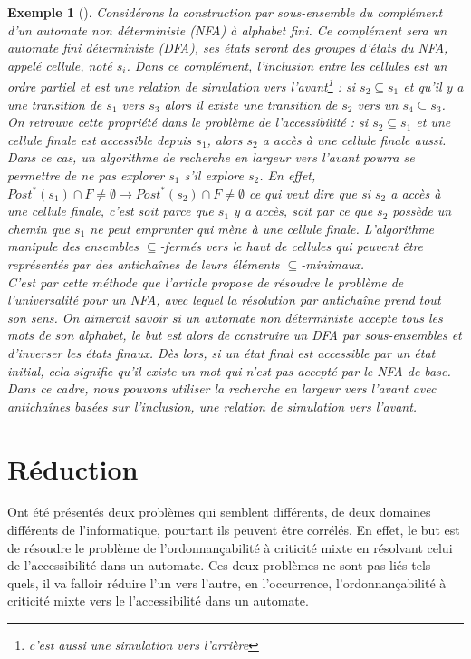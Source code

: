 \documentclass[11pt,a4paper,oneside]{book}
\theoremstyle{break}
\newtheorem{exem}{Exemple}
\theoremstyle{breakplain}
\begin{document}
\begin{exem}[\cite{doyen2010antichain}]
Considérons la construction par sous-ensemble du complément d'un automate non déterministe (NFA) à alphabet fini. Ce complément sera un automate fini déterministe (DFA), ses états seront des groupes d'états du NFA, appelé cellule, noté $s_i$. Dans ce complément, l'inclusion entre les cellules est un ordre partiel et est une relation de simulation vers l'avant\footnote{c'est aussi une simulation vers l'arrière} : si $s_2 \subseteq s_1$ et qu'il y a une transition de $s_1$ vers $s_3$ alors il existe une transition de $s_2$ vers un $s_4 \subseteq s_3$. On retrouve cette propriété dans le problème de l'accessibilité : si $s_2 \subseteq s_1$ et une cellule finale est accessible depuis $s_1$, alors $s_2$ a accès à une cellule finale aussi. Dans ce cas, un algorithme de recherche en largeur vers l'avant pourra se permettre de ne pas explorer $s_1$ s'il explore $s_2$. En effet, $Post^*(s_1) \cap F \neq \emptyset \rightarrow Post^*(s_2) \cap F \neq \emptyset$ ce qui veut dire que si $s_2$ a accès à une cellule finale, c'est soit parce que $s_1$ y a accès, soit par ce que $s_2$ possède un chemin que $s_1$ ne peut emprunter qui mène à une cellule finale. L'algorithme manipule des ensembles $\subseteq$-fermés vers le haut de cellules qui peuvent être représentés par des antichaînes de leurs éléments $\subseteq$-minimaux.\\

C'est par cette méthode que l'article \cite{doyen2010antichain} propose de résoudre le problème de l'universalité pour un NFA, avec lequel la résolution par antichaîne prend tout son sens. On aimerait savoir si un automate non déterministe accepte tous les mots de son alphabet, le but est alors de construire un DFA par sous-ensembles et d'inverser les états finaux. Dès lors, si un état final est accessible par un état initial, cela signifie qu'il existe un mot qui n'est pas accepté par le NFA de base. Dans ce cadre, nous pouvons utiliser la recherche en largeur vers l’avant avec antichaînes basées sur l'inclusion, une relation de simulation vers l'avant.
\end{exem}

\section{Réduction}
Ont été présentés deux problèmes qui semblent différents, de deux domaines différents de l'informatique, pourtant ils peuvent être corrélés. En effet, le but est de résoudre le problème de l'ordonnançabilité à criticité mixte en résolvant celui de l'accessibilité dans un automate. Ces deux problèmes ne sont pas liés tels quels, il va falloir réduire l'un vers l'autre, en l'occurrence, l'ordonnançabilité à criticité mixte vers le l'accessibilité dans un automate.\\
\end{document}
